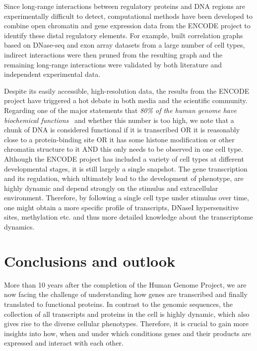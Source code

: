 Since long-range interactions between regulatory proteins
and DNA regions are experimentally difficult to detect,
computational methods have been developed to combine 
open chromatin and gene expression data from the ENCODE
project to identify these distal regulatory elements. 
For example, \cite{Demeyer2014} built correlation graphs 
based on DNase-seq and exon array datasets from a large 
number of cell types, indirect interactions were then pruned
from the resulting graph and the remaining long-range
interactions were validated by both literature and 
independent experimental data.

Despite its easily accessible, high-resolution data,
the results from the ENCODE project have triggered a hot
debate in both media and the scientific community.
Regarding one of the major statements that \emph{80\% of 
the human genome have biochemical functions}~%
\citep{ENCODE2012} and whether this number is too high, 
we note that a chunk of DNA is considered functional if it is transcribed OR it is reasonably close to a protein-binding site OR it has some histone modification or other chromatin structure to it AND this only needs to be observed in one cell type. Although the ENCODE project has included
a variety of cell types at different developmental stages, 
it is still largely a single snapshot. The gene transcription
and its regulation, which ultimately lead to the development
of phenotype, are highly dynamic and depend strongly on the 
stimulus and extracellular environment. Therefore, 
by following a single cell type under stimulus over time,
one might
obtain a more specific profile of transcripts, DNaseI
hypersensitive sites, methylation etc. and thus more detailed
knowledge about the transcriptome dynamics.

\chapter{Conclusions and outlook}
More than 10 years after the completion of the Human Genome
Project, we are now facing the challenge of understanding 
how genes are transcribed and finally translated to functional
proteins. In contrast to the genomic sequences, the collection
of all transcripts and proteins 
in the cell is highly dynamic, which also
gives rise to the diverse cellular phenotypes. Therefore, it
is crucial to gain more insights into 
how, when and under which conditions 
genes and their products 
are expressed and interact with each other.

